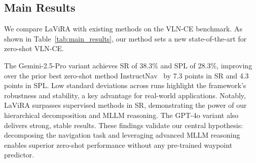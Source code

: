 \documentclass[letterpaper, 10 pt, conference]{ieeeconf}
\begin{document}


\subsection{Main Results}
We compare LaViRA with existing methods on the VLN-CE benchmark. As shown in Table~\ref{tab:main_results}, our method sets a new state-of-the-art for zero-shot VLN-CE.

The Gemini-2.5-Pro variant achieves SR of 38.3\% and SPL of 28.3\%, improving over the prior best zero-shot method InstructNav~\cite{long2024instructnav} by 7.3 points in SR and 4.3 points in SPL.
Low standard deviations across runs highlight the framework’s robustness and stability, a key advantage for real-world applications.
Notably, LaViRA surpasses supervised methods in SR, demonstrating the power of our hierarchical decomposition and MLLM reasoning. The GPT-4o variant also delivers strong, stable results. These findings validate our central hypothesis: decomposing the navigation task and leveraging advanced MLLM reasoning enables superior zero-shot performance without any pre-trained waypoint predictor.
\end{document}

